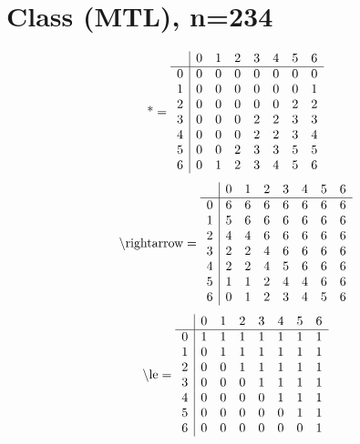 \documentclass[11pt]{article}
\begin{document}
\section{Class (MTL), n=234}
\[\text{*} = 
\begin{array}{r | r r r r r r r}
 & 0 & 1 & 2 & 3 & 4 & 5 & 6 \\ \hline
0 & 0 & 0 & 0 & 0 & 0 & 0 & 0 \\
1 & 0 & 0 & 0 & 0 & 0 & 0 & 1 \\
2 & 0 & 0 & 0 & 0 & 0 & 2 & 2 \\
3 & 0 & 0 & 0 & 2 & 2 & 3 & 3 \\
4 & 0 & 0 & 0 & 2 & 2 & 3 & 4 \\
5 & 0 & 0 & 2 & 3 & 3 & 5 & 5 \\
6 & 0 & 1 & 2 & 3 & 4 & 5 & 6 \\
\end{array}
\]
\[\text{\textbackslash rightarrow} = 
\begin{array}{r | r r r r r r r}
 & 0 & 1 & 2 & 3 & 4 & 5 & 6 \\ \hline
0 & 6 & 6 & 6 & 6 & 6 & 6 & 6 \\
1 & 5 & 6 & 6 & 6 & 6 & 6 & 6 \\
2 & 4 & 4 & 6 & 6 & 6 & 6 & 6 \\
3 & 2 & 2 & 4 & 6 & 6 & 6 & 6 \\
4 & 2 & 2 & 4 & 5 & 6 & 6 & 6 \\
5 & 1 & 1 & 2 & 4 & 4 & 6 & 6 \\
6 & 0 & 1 & 2 & 3 & 4 & 5 & 6 \\
\end{array}
\]
\[\text{\textbackslash le} = 
\begin{array}{r | r r r r r r r}
 & 0 & 1 & 2 & 3 & 4 & 5 & 6 \\ \hline
0 & 1 & 1 & 1 & 1 & 1 & 1 & 1 \\
1 & 0 & 1 & 1 & 1 & 1 & 1 & 1 \\
2 & 0 & 0 & 1 & 1 & 1 & 1 & 1 \\
3 & 0 & 0 & 0 & 1 & 1 & 1 & 1 \\
4 & 0 & 0 & 0 & 0 & 1 & 1 & 1 \\
5 & 0 & 0 & 0 & 0 & 0 & 1 & 1 \\
6 & 0 & 0 & 0 & 0 & 0 & 0 & 1 \\
\end{array}
\]
\end{document}
